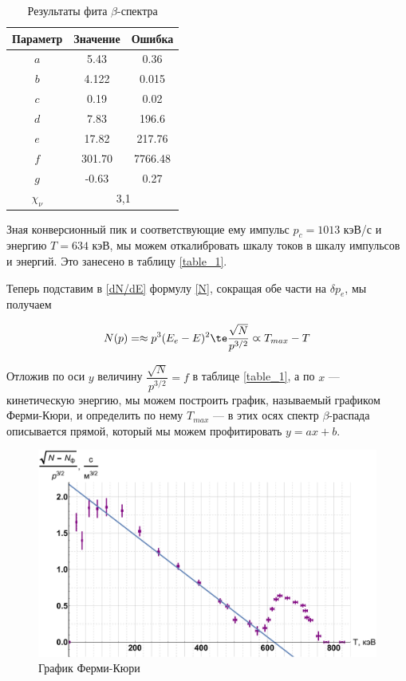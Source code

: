 \documentclass[12pt]{kiarticle} %
\newcommand{\be}{\ensuremath{\beta}}
\begin{document}
\begin{table}[H]
	\caption{Результаты фита \be-спектра}
	\label{fit}
	\begin{center}
	\begin{tabular}{|c|c|c|}
		\hline
		Параметр & Значение & Ошибка \\
	\hline 
$ a $&5.43 & 0.36 \\
$ b $&4.122 & 0.015 \\
$ c $&0.19 & 0.02\\
$ d $&7.83 & 196.6 \\
$ e $&17.82 & 217.76 \\
$ f $&301.70 & 7766.48 \\
$ g $&-0.63 & 0.27 \\
\hline
$ \chi_\nu $ & \multicolumn{2}{|c|}{3,1}  \\
\hline
\end{tabular}
\end{center} 
\end{table}

Зная конверсионный пик и соответствующие ему импульс $ p_c = 1013 $ кэВ/$ с $ и энергию $ T = 634 $ кэВ, мы можем откалибровать шкалу токов в шкалу импульсов и энергий. Это занесено в таблицу \ref{table_1}.

Теперь подставим в \eqref{dN/dE} формулу \eqref{N}, сокращая обе части на $ \delta  p_e $, мы получаем 

\begin{equation}\label{}
N(p) = \approx p^3 (E_e - E)^2 \te \dfrac{\sqrt{N}}{p^{3/2}} \varpropto T_{max} - T
\end{equation}

Отложив по оси $ y $ величину $ \dfrac{\sqrt{N}}{p^{3/2}} = f $ в таблице \ref{table_1}, а по $ x $ --- кинетическую энергию, мы можем построить график, называемый графиком Ферми-Кюри, и определить по нему $ T_{max} $ --- в этих осях спектр \be-распада описывается прямой, который мы можем профитировать $ y = ax +b $.

	\begin{figure}[H]
	\label{graf_kk}
	\includegraphics[scale=0.47]{kk.pdf}
	\caption{График Ферми-Кюри}
\end{figure}
\end{document}
